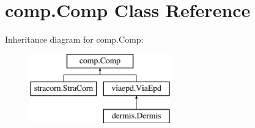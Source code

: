 \hypertarget{classcomp_1_1Comp}{}\section{comp.\+Comp Class Reference}
\label{classcomp_1_1Comp}
Inheritance diagram for comp.\+Comp\+:\begin{figure}[H]
\begin{center}
\leavevmode
\includegraphics[height=3.000000cm]{classcomp_1_1Comp}
\end{center}
\end{figure}
